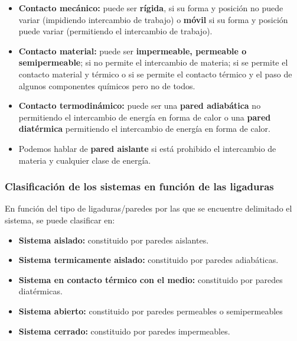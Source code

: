 \documentclass[12pt,a4paper]{article}
\begin{document}
\begin{itemize}

\item \textbf{Contacto mecánico:} puede ser \textbf{rígida}, si su forma y posición no puede variar (impidiendo intercambio de trabajo) o \textbf{móvil} si su forma y posición puede variar (permitiendo el intercambio de trabajo).

\item \textbf{Contacto material:} puede ser \textbf{impermeable, permeable o semipermeable}; si no permite el intercambio de materia; si se permite el contacto material y térmico o si se permite el contacto térmico y el paso de algunos componentes químicos pero no de todos. 

\item \textbf{Contacto termodinámico:} puede ser una \textbf{pared adiabática} no permitiendo el intercambio de energía en forma de calor o una \textbf{pared diatérmica} permitiendo el intercambio de energía en forma de calor.

\item Podemos hablar de \textbf{pared aislante} si está prohibido el intercambio de materia y cualquier clase de energía.

\end{itemize}

\subsubsection{Clasificación de los sistemas en función de las ligaduras}

En función del tipo de ligaduras/paredes por las que se encuentre delimitado el sistema, se puede clasificar en:

\begin{itemize}

\item \textbf{Sistema aislado:} constituido por paredes aislantes.

\item \textbf{Sistema termicamente aislado:} constituido por paredes adiabáticas.

\item \textbf{Sistema en contacto térmico con el medio:} constituido por paredes diatérmicas.

\item \textbf{Sistema abierto:} constituido por paredes permeables o semipermeables

\item \textbf{Sistema cerrado:} constituido por paredes impermeables. 

\end{itemize}
\end{document}
